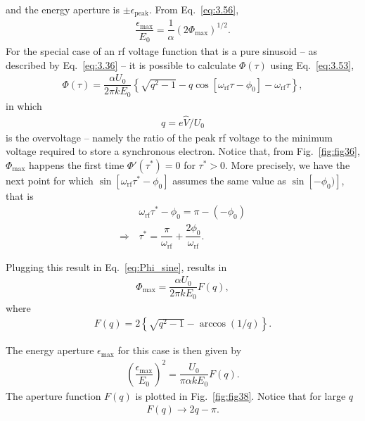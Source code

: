  and the energy aperture is $\pm\epsilon_\text{peak}$. From Eq.~\eqref{eq:3.56},
\begin{align}
	\dfrac{\epsilon_{\max}}{E_0} = \dfrac{1}{\alpha} (2 \Phi_{\max})^{1/2}.
\end{align}
For the special case of an rf voltage function that is a pure sinusoid -- as described by Eq.~\eqref{eq:3.36} -- it is possible to calculate $\Phi(\tau)$ using Eq.~\eqref{eq:3.53},
\begin{align}\label{eq:Phi_sine}
	\Phi(\tau) = \dfrac{\alpha U_0}{2\pi k E_0} \left\lbrace \sqrt{q^2-1} - q \cos [\omega_{\text{rf}}\tau - \phi_0] - \omega_{\text{rf}} \tau \right\rbrace,
\end{align}
in which
\begin{align} \label{eq:3.60}
q = e\hat{V}/U_0
\end{align}
is the overvoltage -- namely the ratio of the peak rf voltage to the minimum voltage required to store a synchronous electron. Notice that, from Fig.~\ref{fig:fig36}, $\Phi_{\max}$ happens the first time $\Phi'(\tau^*) = 0$ for $\tau^* > 0$. More precisely, we have the next point for which $\sin[\omega_{\text{rf}}\tau^*-\phi_0]$ assumes the same value as $\sin[-\phi_0)]$, that is
\begin{align*}
	& \omega_{\text{rf}}\tau^* - \phi_0 = \pi - (-\phi_0) \\
    \Rightarrow \, & \tau^* = \dfrac{\pi}{\omega_{\text{rf}}} + \dfrac{2\phi_0}{\omega_{\text{rf}}}.
\end{align*}

Plugging this result in Eq.~\eqref{eq:Phi_sine}, results in
\begin{align} \label{eq:3.58}
	\Phi_{\max} = \dfrac{\alpha U_0}{2\pi k E_0} F(q),
\end{align}
where
\begin{align}
	F(q) = 2\left\lbrace \sqrt{q^2 - 1} - \arccos(1/q) \right\rbrace.
\end{align}

The energy aperture $\epsilon_{\max}$ for this case is then given by
\begin{align}
	\left(\dfrac{\epsilon_{\max}}{E_0}\right)^2 = \dfrac{U_0}{\pi \alpha k E_0} F(q).
\end{align}
The aperture function $F(q)$ is plotted in Fig.~\ref{fig:fig38}. Notice that for large $q$
\begin{align}
	F(q) \to 2q - \pi.
\end{align}

